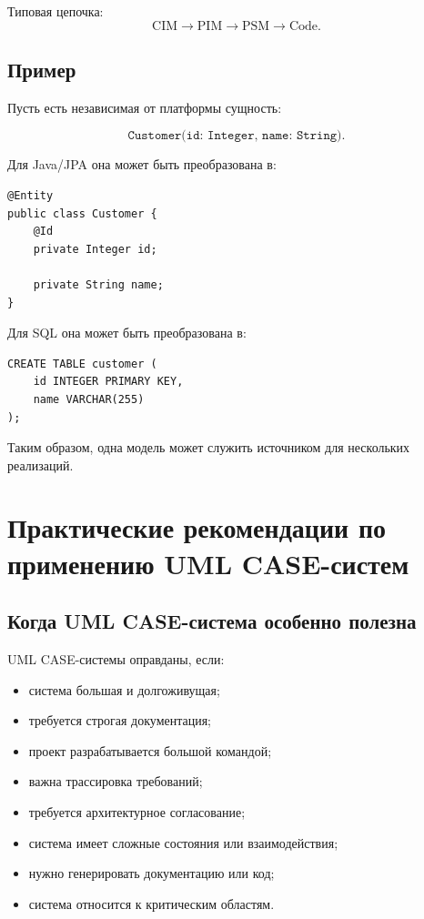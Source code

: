 \documentclass[12pt,a4paper]{article}
\begin{document}
Типовая цепочка:
\[
\text{CIM} \rightarrow \text{PIM} \rightarrow \text{PSM} \rightarrow \text{Code}.
\]

\subsection{Пример}

Пусть есть независимая от платформы сущность:

\[
\texttt{Customer(id: Integer, name: String)}.
\]

Для Java/JPA она может быть преобразована в:

\begin{verbatim}
@Entity
public class Customer {
    @Id
    private Integer id;

    private String name;
}
\end{verbatim}

Для SQL она может быть преобразована в:

\begin{verbatim}
CREATE TABLE customer (
    id INTEGER PRIMARY KEY,
    name VARCHAR(255)
);
\end{verbatim}

Таким образом, одна модель может служить источником для нескольких реализаций.

\section{Практические рекомендации по применению UML CASE-систем}

\subsection{Когда UML CASE-система особенно полезна}

UML CASE-системы оправданы, если:
\begin{itemize}
    \item система большая и долгоживущая;
    \item требуется строгая документация;
    \item проект разрабатывается большой командой;
    \item важна трассировка требований;
    \item требуется архитектурное согласование;
    \item система имеет сложные состояния или взаимодействия;
    \item нужно генерировать документацию или код;
    \item система относится к критическим областям.
\end{itemize}
\end{document}

